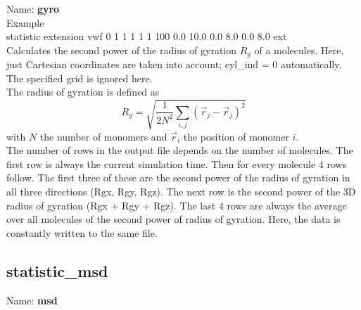 \documentclass[a4paper,10pt]{scrreprt}
\begin{document}
Name: {\bfseries gyro}\\[2ex]
Example\\[0.5ex]
statistic       extension vwf 0 1 1 1 1 1 100 0.0 10.0 0.0 8.0 0.0 8.0 ext
\\[2ex]
Calculates the second power of the radius of gyration $R_g$ of a molecules.
Here, just Cartesian coordinates are taken into account; cyl\_ind = 0 automatically.
The specified grid is ignored here.
\\[2ex]
The radius of gyration is defined as
%
\begin{equation}
 R_g = \sqrt{\frac{1}{2N^2}\sum_{i,j}(\vec{r}_j-\vec{r}_j)^2}
\end{equation}
%
with $N$ the number of monomers and $\vec{r}_i$ the position of monomer $i$.
\\[2ex]
The number of rows in the output file depends on the number of molecules.
The first row is always the current simulation time.
Then for every molecule 4 rows follow.
The first three of these are the second power of the radius of gyration in all three directions (Rgx, Rgy, Rgz).
The next row is the second power of the 3D radius of gyration (Rgx + Rgy + Rgz).
The last 4 rows are always the average over all molecules of the second power of radius of gyration.
Here, the data is constantly written to the same file.


\subsection{statistic\_msd}\label{ssec:stat_msd}

Name: {\bfseries msd}
\\[2ex]
\end{document}
